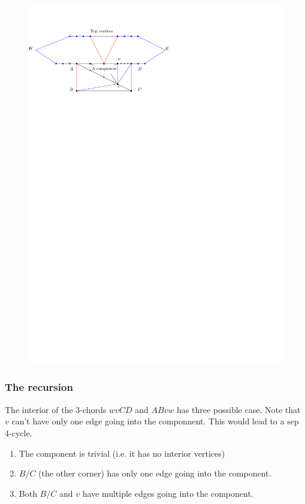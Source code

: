 \begin{figure}[h]
  \centering
  \includegraphics[scale=1]{chordShrink/img/cOneEdge}
  \caption{}
  \label{fig:shrink:coneedge}
\end{figure}



\subsubsection{The recursion}
The interior of the $3$-chords $wvCD$ and $ABvw$ has three possible case. Note that $v$ can't have only one edge going into the componnent. This would lead to a sep 4-cycle.

\begin{enumerate}
  \item The component is trivial (i.e. it has no interior vertices)
  \item $B/C$ (the other corner) has only one edge going into the component.
  \item Both $B/C$ and $v$ have multiple edges going into the component.
\end{enumerate}


